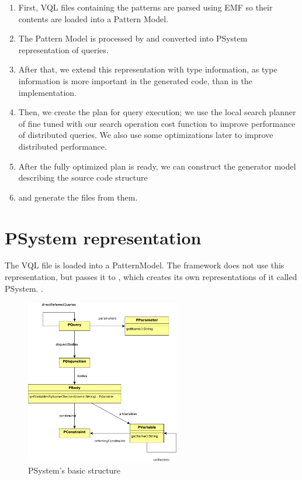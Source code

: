 \begin{enumerate}[(1)]

\item 
First, VQL files containing the patterns are parsed using EMF so their contents are loaded into a Pattern Model.
\item 
The Pattern Model is processed by \viatra{} and converted into PSystem representation of queries.
\item 
After that, we extend this representation with type information, as type information is more important in the \cpp{} generated code, than in the \viatra{} implementation.
\item 
Then, we create the plan for query execution; we use the local search planner of \viatra{} fine tuned with our search operation cost function to improve performance of distributed queries. 
We also use some optimizations later to improve distributed performance. 
\item 
After the fully optimized plan is ready, we can construct the generator model describing the source code structure 
\item
and generate the \cpp{} files from them.

\end{enumerate}



\section{PSystem representation}


The VQL file is loaded into a PatternModel. 
The framework does not use this representation, but passes it to \viatra, which creates its own representations of it called PSystem. \cite{psystem}. 


\begin{figure}[H]
	\begin{center}
		\includegraphics[width=0.6\textwidth]{figures/psystem.pdf}
		\caption{PSystem's basic structure}
		\label{fig:psystem}
	\end{center}
\end{figure}

